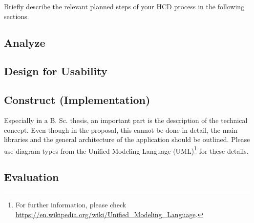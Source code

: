Briefly describe the relevant planned steps of your HCD process in the following sections.

\subsection{Analyze}
\label{subsec:analyze}

\subsection{Design for Usability}
\label{subsec:design}

\subsection{Construct (Implementation)}
\label{subsec:implementation}

Especially in a B. Sc. thesis, an important part is the description of the technical concept. Even though in the proposal, this cannot be done in detail, the main libraries and the general architecture of the application should be outlined. Please use diagram types from the Unified Modeling Language (UML)\footnote{For further information, please check \url{https://en.wikipedia.org/wiki/Unified_Modeling_Language}.} for these details.

\subsection{Evaluation}
\label{subsec:evaluation}